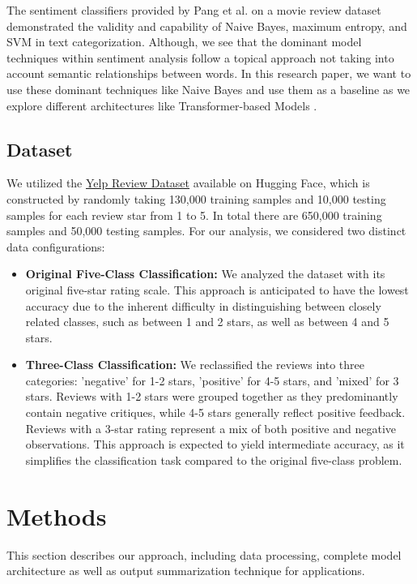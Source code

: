 \documentclass[11pt]{article}
\begin{document}
The sentiment classifiers provided by Pang et al. \citep{pang2008sentiment} on a movie review dataset demonstrated the validity and capability of Naive Bayes, maximum entropy, and SVM in text categorization. Although, we see that the dominant model techniques within sentiment analysis follow a topical approach not taking into account semantic relationships between words. In this research paper, we want to use these dominant techniques like Naive Bayes and use them as a baseline as we explore different architectures like Transformer-based Models \citep{kokab2022transformer}.

\subsection{Dataset}
We utilized the \href{https://huggingface.co/datasets/Yelp/yelp_review_full}{Yelp Review Dataset} available on Hugging Face, which is constructed by randomly taking 130,000 training samples and 10,000 testing samples for each review star from 1 to 5. In total there are 650,000 training samples and 50,000 testing samples. For our analysis, we considered two distinct data configurations:

\begin{itemize}
  \item \textbf{Original Five-Class Classification:} We analyzed the dataset with its original five-star rating scale. This approach is anticipated to have the lowest accuracy due to the inherent difficulty in distinguishing between closely related classes, such as between 1 and 2 stars, as well as between 4 and 5 stars.

  \item \textbf{Three-Class Classification:} We reclassified the reviews into three categories: 'negative' for 1-2 stars, 'positive' for 4-5 stars, and 'mixed' for 3 stars. Reviews with 1-2 stars were grouped together as they predominantly contain negative critiques, while 4-5 stars generally reflect positive feedback. Reviews with a 3-star rating represent a mix of both positive and negative observations. This approach is expected to yield intermediate accuracy, as it simplifies the classification task compared to the original five-class problem.
\end{itemize}

\section{Methods}
This section describes our approach, including data processing, complete model architecture as well as output summarization technique for applications.
\end{document}
